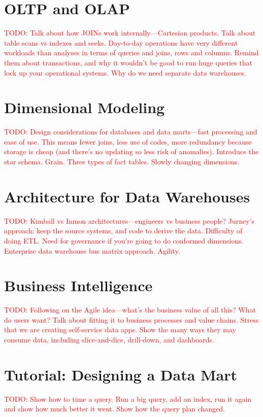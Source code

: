 \documentclass[11pt]{book}
\newcommand{\todo}[1]{\textcolor{red}{TODO: #1}} %
\begin{document}
\section{OLTP and OLAP}
\todo{Talk about how JOINs work internally---Cartesian products.  Talk about table scans vs indexes and seeks.  Day-to-day operations have very different workloads than analyses in terms of queries and joins, rows and columns.  Remind them about transactions, and why it wouldn't be good to run huge queries that lock up your operational systems.  Why do we need separate data warehouses.}

\section{Dimensional Modeling}
\todo{Design considerations for databases and data marts---fast processing and ease of use.  This means fewer joins, less use of codes, more redundancy because storage is cheap (and there's no updating so less risk of anomalies).  Introduce the star schema.  Grain.  Three types of fact tables.  Slowly changing dimensions.}

\section{Architecture for Data Warehouses}
\todo{Kimball vs Inmon architectures---engineers vs business people?  Jurney's approach: keep the source systems, and code to derive the data.  Difficulty of doing ETL.  Need for governance if you're going to do conformed dimensions.  Enterprise data warehouse bus matrix approach. Agility.}

\section{Business Intelligence}
\todo{Following on the Agile idea---what's the business value of all this? What do users want?  Talk about fitting it to business processes and value chains.  Stress that we are creating self-service data apps.  Show the many ways they may consume data, including slice-and-dice, drill-down, and dashboards.}


\section*{Tutorial: Designing a Data Mart}

\todo{Show how to time a query.  Run a big query, add an index, run it again and show how much better it went.  Show how the query plan changed.}
\end{document}
